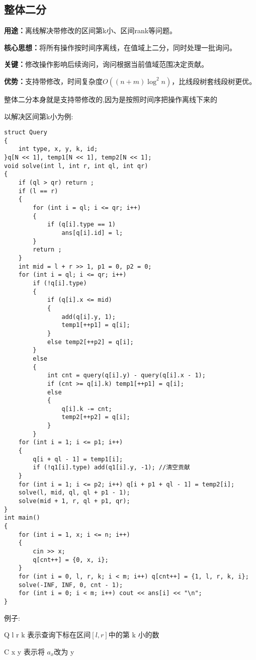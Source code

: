 \documentclass[a4paper,fontset=none]{ctexart}
\begin{document}
\subsection{整体二分}
\textbf{用途：}离线解决带修改的区间第k小、区间rank等问题。

\textbf{核心思想：}将所有操作按时间序离线，在值域上二分，同时处理一批询问。

\textbf{关键：}修改操作影响后续询问，询问根据当前值域范围决定贡献。

\textbf{优势：}支持带修改，时间复杂度$O((n+m)\log^2 n)$，比线段树套线段树更优。

整体二分本身就是支持带修改的,因为是按照时间序把操作离线下来的

以解决区间第k小为例:
\begin{verbatim}
struct Query
{
    int type, x, y, k, id;
}q[N << 1], temp1[N << 1], temp2[N << 1];
void solve(int l, int r, int ql, int qr)
{
    if (ql > qr) return ;
    if (l == r)
    {
        for (int i = ql; i <= qr; i++)
        {
            if (q[i].type == 1)
                ans[q[i].id] = l;
        }
        return ;
    }
    int mid = l + r >> 1, p1 = 0, p2 = 0;
    for (int i = ql; i <= qr; i++)
        if (!q[i].type)
        {
            if (q[i].x <= mid)
            {
                add(q[i].y, 1);
                temp1[++p1] = q[i];
            }
            else temp2[++p2] = q[i];
        }
        else
        {
            int cnt = query(q[i].y) - query(q[i].x - 1);
            if (cnt >= q[i].k) temp1[++p1] = q[i];
            else
            {
                q[i].k -= cnt;
                temp2[++p2] = q[i];
            }
        }
    for (int i = 1; i <= p1; i++)
    {
        q[i + ql - 1] = temp1[i];
        if (!q1[i].type) add(q1[i].y, -1); //清空贡献
    }
    for (int i = 1; i <= p2; i++) q[i + p1 + ql - 1] = temp2[i];
    solve(l, mid, ql, ql + p1 - 1);
    solve(mid + 1, r, ql + p1, qr);
}
int main()
{
    for (int i = 1, x; i <= n; i++)
    {
        cin >> x;
        q[cnt++] = {0, x, i};
    }
    for (int i = 0, l, r, k; i < m; i++) q[cnt++] = {1, l, r, k, i};
    solve(-INF, INF, 0, cnt - 1);
    for (int i = 0; i < m; i++) cout << ans[i] << "\n";
}
\end{verbatim}
例子:

Q l r k 表示查询下标在区间$[l,r]$中的第 k 小的数

C x y 表示将 $a_x$改为 y
\end{document}
